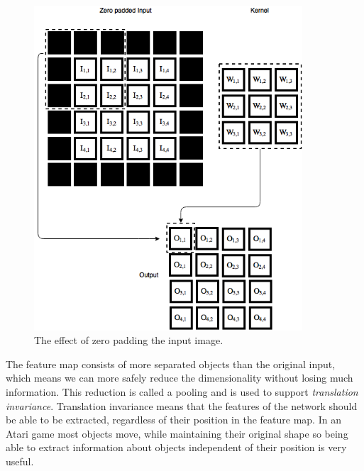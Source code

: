 \documentclass[11pt]{article}
\begin{document}
\begin{figure}[!h]\label{con2}
    \centering
    \includegraphics[width=10cm]{include/conv_2_zero_pad.png}
    \caption{The effect of zero padding the input image.}
    \label{fig:conv}
\end{figure}
The feature map consists of more separated objects than the original input,
which means we can more safely reduce the dimensionality without losing much information.
This reduction is called a pooling and is used to support
\textit{translation invariance}.
Translation invariance means that the features of the network should be able to
be extracted, regardless of their position in the feature map.
In an Atari game most objects move, while maintaining their original shape so being able to
extract information about objects independent of their position is very useful.
\end{document}
